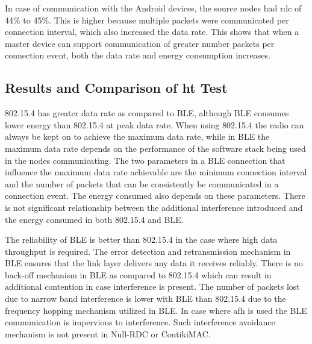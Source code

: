 In case of communication with the Android devices, the source nodes had \gls{rdc} of 44\% to 45\%. This is higher because multiple packets were communicated per connection interval, which also increased the data rate. This shows that when a master device can support communication of greater number packets per connection event, both the data rate and energy consumption increases.

%

\subsection{Results and Comparison of \texorpdfstring{\acrlong{ht}}{High-Throughput} Test}

802.15.4 has greater data rate as compared to BLE, although BLE consumes lower energy than 802.15.4 at peak data rate. When using 802.15.4 the radio can always be kept on to achieve the maximum data rate, while in BLE the maximum data rate depends on the performance of the software stack being used in the nodes communicating. The two parameters in a BLE connection that influence the maximum data rate  achievable are the minimum connection interval and the number of packets that can be consistently be communicated in a connection event. The energy consumed also depends on these parameters. There is not significant relationship between the additional interference introduced and the energy consumed in both 802.15.4 and BLE. 

The reliability of BLE is better than 802.15.4 in the case where high data throughput is required. The error detection and retransmission mechanism in BLE ensures that the link layer delivers any data it receives reliably. There is no back-off mechanism in BLE as compared to 802.15.4 which can result in additional contention in case interference is present. The number of packets lost due to narrow band interference is lower with BLE than 802.15.4 due to the frequency hopping mechanism utilized in BLE. In case where \gls{afh} is used the BLE communication is impervious to interference. Such interference avoidance mechanism is not present in Null-RDC or ContikiMAC.

